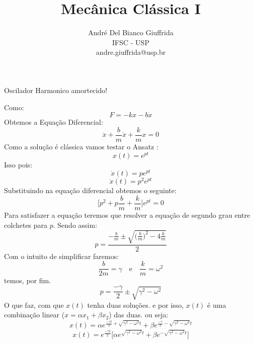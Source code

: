 \documentclass[a4paper,12pt]{article}
\title{ Mecânica Clássica I}
\author{\small André Del Bianco Giuffrida\\ \small IFSC - USP\\ \small andre.giuffrida@usp.br}
\date{}
\begin{document}
\maketitle
	Oscilador Harmonico amortecido!
	
	Como:
	\[ F = -kx -b\dot{x}\]
	Obtemos a Equação Diferencial:
	\[ \ddot{x} + \frac{b}{m}\dot{x} + \frac{k}{m}x = 0\]
	Como a solução é clássica vamos testar o Ansatz :
	\[x(t) = e^{pt} \]
	Isso pois:
	\[\dot{x}(t) = pe^{pt} \]
	\[\ddot{x}(t) = p^2e^{pt} \]
	Substituindo na equação diferencial obtemos o seguinte:
	\[ \Bigg[ p^2 + p\frac{b}{m} + \frac{k}{m} \Bigg]e^{pt}= 0 \]
	Para satisfazer a equação teremos que resolver a equação de segundo grau entre colchetes para $p$.
	Sendo assim:
	\[ p = \frac{ -\frac{b}{m} \pm \sqrt{\Big(\frac{b}{m}\Big)^{2} - 4\frac{k}{m} } }{2}\]
	Com o intuito de simplificar faremos: 
	\[\frac{b}{2m} = \gamma \quad \text{e} \quad \frac{k}{m}=\omega^2\]
	temos, por fim.
	\[ p = \frac{ -\gamma}{2} \pm \sqrt{\gamma^2 - \omega^2}\]
	O que faz, com que $x(t)$ tenha duas soluções.
	e por isso, $x(t)$ é uma combinação linear ($x = \alpha x_1 + \beta x_2 $) das duas.
	ou seja:
	\[ x(t) =  \alpha e^{\frac{ -\gamma t}{2} + \sqrt{\gamma^2 - \omega^2}t} + \beta e^{\frac{ -\gamma}{2} - \sqrt{\gamma^2 - \omega^2} t}\]
	\[ x(t) =  e^{\frac{ -\gamma t}{2}} \Big[\alpha e^{\sqrt{\gamma^2 - \omega^2}t} + \beta e^{- \sqrt{\gamma^2 - \omega^2}t} \Big]\]
	
\end{document}

